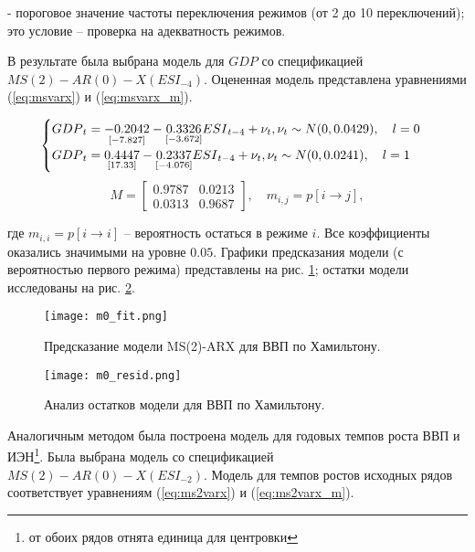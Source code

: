 \documentclass[a4paper,14pt]{extreport}
\begin{document}
	- пороговое значение частоты переключения режимов (от 2 до 10 переключений); это условие -- проверка на адекватность режимов.
	
	В результате была выбрана модель для ${GDP}$ со спецификацией $MS(2)-AR(0)-X({ESI}_{-4})$. Оцененная модель представлена уравнениями (\ref{eq:msvarx}) и (\ref{eq:msvarx_m}).
	
	{
		
		\begin{equation}
		\begin{cases}
		{GDP}_{t} = 
		\underset{[-7.827]}{-0.2042} 
		- \underset{[-3.672]}{0.3326} {ESI}_{t-4}
		+ \nu_{t} , \space \nu_{t} \sim N(0, 0.0429)
		, \quad l=0 \\
		{GDP}_{t} = 
		\underset{[17.33]}{0.4447}
		- \underset{[-4.076]}{0.2337} {ESI}_{t-4}
		+ \nu_{t} , \space \nu_{t} \sim N(0, 0.0241)
		, \quad l=1
		\end{cases}			
		\label{eq:msvarx}
		\end{equation}
		\begin{equation}
		M = 
		\begin{bmatrix}
		0.9787 & 0.0213 \\
		0.0313 & 0.9687
		\end{bmatrix}
		, \quad m_{i,j} = p[i \rightarrow j],
		\label{eq:msvarx_m}
		\end{equation}
		
	}
	
	где $m_{i,i} = p[i \rightarrow i]$ -- вероятность остаться в режиме $i$. Все коэффициенты оказались значимыми на уровне $0.05$. Графики предсказания модели (с вероятностью первого режима) представлены на рис. \ref{fig:hp-fitcompare}; остатки модели исследованы на рис. \ref{fig:hp-residcomp}.
	
	{
		\begin{figure}
			\texttt{[image: m0\_fit.png]}
			\caption{Предсказание модели MS(2)-ARX для ВВП по Хамильтону.}
			\label{fig:hp-fitcompare}
		\end{figure}
		\begin{figure}
			\texttt{[image: m0\_resid.png]}
			\caption{Анализ остатков модели для ВВП по Хамильтону.}
			\label{fig:hp-residcomp}
		\end{figure}
	}
	
	
	Аналогичным методом была построена модель для годовых темпов роста ВВП и ИЭН\footnote{от обоих рядов отнята единица для центровки}. Была выбрана модель со спецификацией $MS(2)-AR(0)-X({ESI}_{-2})$. Модель для темпов ростов исходных рядов соответствует уравнениям (\ref{eq:ms2varx}) и (\ref{eq:ms2varx_m}).
	
\end{document}
